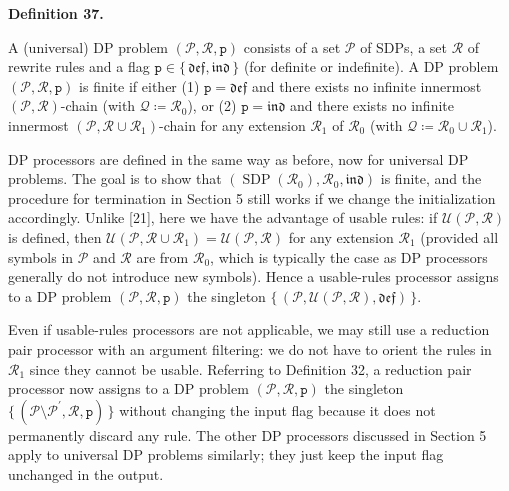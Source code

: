 \documentclass[10pt,a4paper]{amsart}
\providecommand{\coloneq}{\coloneqq}
\begin{document}
 
 
\par\medskip\noindent\textbf{Definition 37.}\par
 
 
A (universal) DP problem $(\mathcal{P},\mathcal{R},\mathtt{p})$ consists of a set $\mathcal{P}$ of SDPs, a set $\mathcal{R}$ of rewrite rules and a flag $\mathtt{p}\in\{\,\mathfrak{def},\mathfrak{ind}\,\}$ (for definite or indefinite). A DP problem $(\mathcal{P},\mathcal{R},\mathtt{p})$ is finite if either (1) $\mathtt{p}=\mathfrak{def}$ and there exists no infinite innermost $(\mathcal{P},\mathcal{R})$-chain (with $\mathcal{Q}\coloneq\mathcal{R}_{0}$), or (2) $\mathtt{p}=\mathfrak{ind}$ and there exists no infinite innermost $(\mathcal{P},\mathcal{R}\cup\mathcal{R}_{1})$-chain for any extension $\mathcal{R}_{1}$ of $\mathcal{R}_{0}$ (with $\mathcal{Q}\coloneq\mathcal{R}_{0}\cup\mathcal{R}_{1}$).\par
 
 
 
 
DP processors are defined in the same way as before, now for universal DP problems. The goal is to show that $(\operatorname{SDP}(\mathcal{R}_{0}),\mathcal{R}_{0},\mathfrak{ind})$ is finite, and the procedure for termination in Section 5 still works if we change the initialization accordingly. Unlike [21], here we have the advantage of usable rules: if $\mathcal{U}(\mathcal{P},\mathcal{R})$ is defined, then $\mathcal{U}(\mathcal{P},\mathcal{R}\cup\mathcal{R}_{1})=\mathcal{U}(\mathcal{P},\mathcal{R})$ for any extension $\mathcal{R}_{1}$ (provided all symbols in $\mathcal{P}$ and $\mathcal{R}$ are from $\mathcal{R}_{0}$, which is typically the case as DP processors generally do not introduce new symbols). Hence a usable-rules processor assigns to a DP problem $(\mathcal{P},\mathcal{R},\mathtt{p})$ the singleton $\{\,(\mathcal{P},\mathcal{U}(\mathcal{P},\mathcal{R}),\mathfrak{def})\,\}$.\par
 
 
 
Even if usable-rules processors are not applicable, we may still use a reduction pair processor with an argument filtering: we do not have to orient the rules in $\mathcal{R}_{1}$ since they cannot be usable. Referring to Definition 32, a reduction pair processor now assigns to a DP problem $(\mathcal{P},\mathcal{R},\mathtt{p})$ the singleton $\{\,(\mathcal{P}\setminus\mathcal{P}^{\prime},\mathcal{R},\mathtt{p})\,\}$ without changing the input flag because it does not permanently discard any rule. The other DP processors discussed in Section 5 apply to universal DP problems similarly; they just keep the input flag unchanged in the output.\par
 
\end{document}

